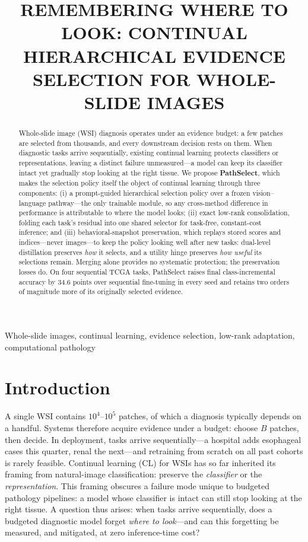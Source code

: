 \documentclass{article}
\title{REMEMBERING WHERE TO LOOK: CONTINUAL HIERARCHICAL EVIDENCE SELECTION FOR WHOLE-SLIDE IMAGES}
\begin{document}
\ninept %
%
\maketitle
%
\begin{abstract}
Whole-slide image (WSI) diagnosis operates under an evidence budget: a few patches are selected from thousands, and every downstream decision rests on them. When diagnostic tasks arrive sequentially, existing continual learning protects classifiers or representations, leaving a distinct failure unmeasured---a model can keep its classifier intact yet gradually stop looking at the right tissue. We propose \textbf{PathSelect}, which makes the selection policy itself the object of continual learning through three components: (i) a prompt-guided hierarchical selection policy over a frozen vision--language pathway---the only trainable module, so any cross-method difference in performance is attributable to where the model looks; (ii) exact low-rank consolidation, folding each task's residual into one shared selector for task-free, constant-cost inference; and (iii) behavioral-snapshot preservation, which replays stored scores and indices---never images---to keep the policy looking well after new tasks: dual-level distillation preserves \emph{how} it selects, and a utility hinge preserves \emph{how useful} its selections remain. Merging alone provides no systematic protection; the preservation losses do. On four sequential TCGA tasks, PathSelect raises final class-incremental accuracy by 34.6 points over sequential fine-tuning in every seed and retains two orders of magnitude more of its originally selected evidence.
\end{abstract}
%
\begin{keywords}
Whole-slide images, continual learning, evidence selection, low-rank adaptation, computational pathology
\end{keywords}
%
\section{Introduction}
\label{sec:intro}
A single WSI contains $10^4$--$10^5$ patches, of which a diagnosis typically depends on a handful. Systems therefore acquire evidence under a budget: choose $B$ patches, then decide. In deployment, tasks arrive sequentially---a hospital adds esophageal cases this quarter, renal the next---and retraining from scratch on all past cohorts is rarely feasible. Continual learning (CL) for WSIs has so far inherited its framing from natural-image classification: preserve the \emph{classifier} or the \emph{representation}. This framing obscures a failure mode unique to budgeted pathology pipelines: a model whose classifier is intact can still stop looking at the right tissue. A question thus arises: when tasks arrive sequentially, does a budgeted diagnostic model forget \emph{where to look}---and can this forgetting be measured, and mitigated, at zero inference-time cost?
\end{document}
